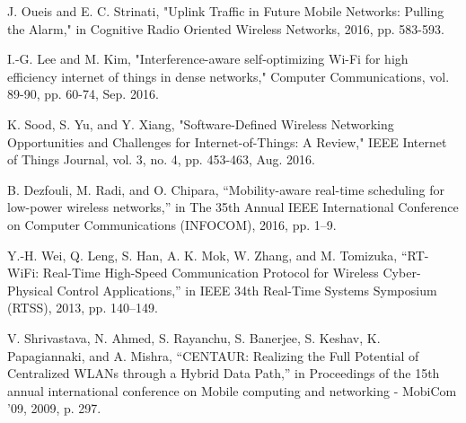 \begin{thebibliography}{1}
J. Oueis and E. C. Strinati, "Uplink Traffic in Future Mobile Networks: Pulling the Alarm," in Cognitive Radio Oriented Wireless Networks, 2016, pp. 583-593.

 I.-G. Lee and M. Kim, "Interference-aware self-optimizing Wi-Fi for high efficiency internet of things in dense networks," Computer Communications, vol. 89-90, pp. 60-74, Sep. 2016.

 K. Sood, S. Yu, and Y. Xiang, "Software-Defined Wireless Networking Opportunities and Challenges for Internet-of-Things: A Review," IEEE Internet of Things Journal, vol. 3, no. 4, pp. 453-463, Aug. 2016.

 B. Dezfouli, M. Radi, and O. Chipara, “Mobility-aware real-time scheduling for low-power wireless networks,” in The 35th Annual IEEE International Conference on Computer Communications (INFOCOM), 2016, pp. 1–9.

 Y.-H. Wei, Q. Leng, S. Han, A. K. Mok, W. Zhang, and M. Tomizuka, “RT-WiFi: Real-Time High-Speed Communication Protocol for Wireless Cyber-Physical Control Applications,” in IEEE 34th Real-Time Systems Symposium (RTSS), 2013, pp. 140–149.

 V. Shrivastava, N. Ahmed, S. Rayanchu, S. Banerjee, S. Keshav, K. Papagiannaki, and A. Mishra, “CENTAUR: Realizing the Full Potential of Centralized WLANs through a Hybrid Data Path,” in Proceedings of the 15th annual international conference on Mobile computing and networking - MobiCom ’09, 2009, p. 297.




\end{thebibliography}
